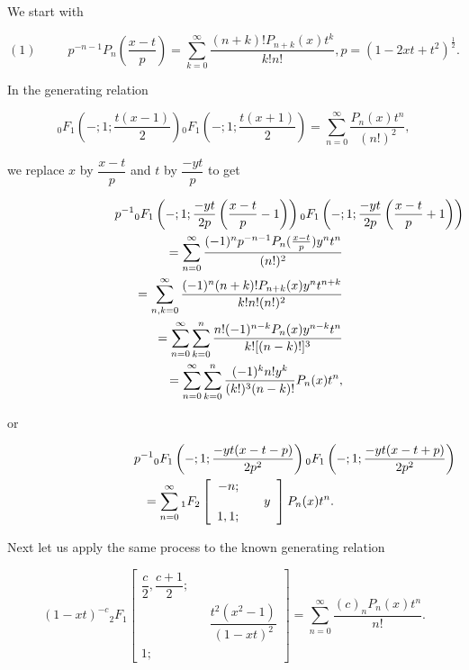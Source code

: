 \begin{solution}
We start with

$$(1) \hspace{30pt} p^{-n-1} P_n \left( \dfrac{x-t}{p} \right) = \displaystyle\sum_{k=0}^{\infty} \dfrac{(n+k)! P_{n+k}(x)t^k}{k!n!}, p=(1-2xt+t^2)^{\frac{1}{2}}.$$

In the generating relation

$${}_0F_1 \left(-;1;\dfrac{t(x-1)}{2} \right) {}_0F_1 \left( -; 1; \dfrac{t(x+1)}{2} \right) = \displaystyle\sum_{n=0}^{\infty} \dfrac{P_n(x)t^n}{(n!)^2},$$

we replace $x$ by $\dfrac{x-t}{p}$ and $t$ by $\dfrac{-yt}{p}$ to get

\begin{eqnarray*}
\lefteqn{\!\!\!\!\!p^{-1}{}_0F_1 \left( -; 1; \dfrac{-yt}{2p} \left( \dfrac{x-t}{p} -1 \right) \right) {}_0F_1 \left( -; 1; \dfrac{-yt}{2p} \left( \dfrac{x-t}{p}+1 \right) \right)} \\
& &= \displaystyle\sum_{n=0}^{\infty} \dfrac{(-1)^n p^{-n-1} P_n (\frac{x-t}{p}) y^n t^n}{(n!)^2} \\
&&= \displaystyle\sum_{n,k=0}^{\infty} \dfrac{(-1)^n (n+k)! P_{n+k}(x) y^n t^{n+k}}{k! n! (n!)^2} \\
&&= \displaystyle\sum_{n=0}^{\infty} \displaystyle\sum_{k=0}^{n} \dfrac{n! (-1)^{n-k} P_n(x) y^{n-k} t^n}{k! [(n-k)!]^3} \\
&&= \displaystyle\sum_{n=0}^{\infty} \displaystyle\sum_{k=0}^n \dfrac{(-1)^k n! y^k}{(k!)^3 (n-k)!} P_n(x)t^n,
\end{eqnarray*}

or

\begin{eqnarray*}
\lefteqn{p^{-1} {}_0F_1 \left( -; 1 ; \dfrac{-yt(x-t-p)}{2p^2} \right) {}_0F_1 \left( -; 1; \dfrac{-yt(x-t+p)}{2p^2} \right)} \\
&& = \displaystyle\sum_{n=0}^{\infty} {}_1F_2 \left[ \begin{array}{rlr} 
-n; & & \\
& & y \\
1,1; & & 
\end{array} \right] P_n(x) t^n.
\end{eqnarray*}

Next let us apply the same process to the known generating relation

$$(1-xt)^{-c} {}_2F_1 \left[ \begin{array}{rlr} 
\dfrac{c}{2}, \dfrac{c+1}{2}; & & \\
& & \dfrac{t^2(x^2-1)}{(1-xt)^2} \\
1; & &
\end{array} \right] = \displaystyle\sum_{n=0}^{\infty} \dfrac{(c)_n P_n(x) t^n}{n!}.$$


\end{solution}
